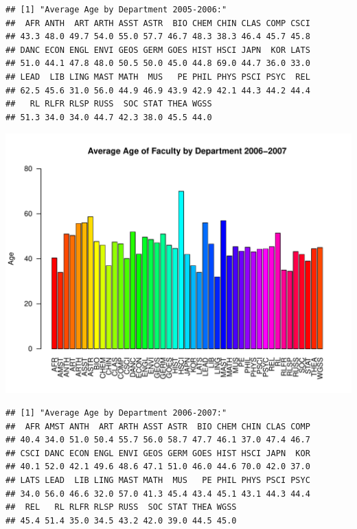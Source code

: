 \documentclass[12pt,a4paper]{article}\usepackage[]{graphicx}\usepackage[]{color}
\makeatletter
\def\maxwidth{ %
  \ifdim\Gin@nat@width>\linewidth
    \linewidth
  \else
    \Gin@nat@width
  \fi
}
\newenvironment{kframe}{%
 \def\at@end@of@kframe{}%
 \ifinner\ifhmode%
  \def\at@end@of@kframe{\end{minipage}}%
  \begin{minipage}{\columnwidth}%
 \fi\fi%
 \def\FrameCommand##1{\hskip\@totalleftmargin \hskip-\fboxsep
 \colorbox{shadecolor}{##1}\hskip-\fboxsep
     \hskip-\linewidth \hskip-\@totalleftmargin \hskip\columnwidth}%
 \MakeFramed {\advance\hsize-\width
   \@totalleftmargin\z@ \linewidth\hsize
   \@setminipage}}%
 {\par\unskip\endMakeFramed%
 \at@end@of@kframe}
\newenvironment{knitrout}{}{} %
\theoremstyle{definition}
\makeatother
\begin{document}
\begin{knitrout}
\begin{kframe}\begin{verbatim}
## [1] "Average Age by Department 2005-2006:"
##  AFR ANTH  ART ARTH ASST ASTR  BIO CHEM CHIN CLAS COMP CSCI 
## 43.3 48.0 49.7 54.0 55.0 57.7 46.7 48.3 38.3 46.4 45.7 45.8 
## DANC ECON ENGL ENVI GEOS GERM GOES HIST HSCI JAPN  KOR LATS 
## 51.0 44.1 47.8 48.0 50.5 50.0 45.0 44.8 69.0 44.7 36.0 33.0 
## LEAD  LIB LING MAST MATH  MUS   PE PHIL PHYS PSCI PSYC  REL 
## 62.5 45.6 31.0 56.0 44.9 46.9 43.9 42.9 42.1 44.3 44.2 44.4 
##   RL RLFR RLSP RUSS  SOC STAT THEA WGSS 
## 51.3 34.0 34.0 44.7 42.3 38.0 45.5 44.0
\end{verbatim}
\end{kframe}
\includegraphics[width=\maxwidth]{figure/unnamed-chunk-9-3} 
\begin{kframe}\begin{verbatim}
## [1] "Average Age by Department 2006-2007:"
##  AFR AMST ANTH  ART ARTH ASST ASTR  BIO CHEM CHIN CLAS COMP 
## 40.4 34.0 51.0 50.4 55.7 56.0 58.7 47.7 46.1 37.0 47.4 46.7 
## CSCI DANC ECON ENGL ENVI GEOS GERM GOES HIST HSCI JAPN  KOR 
## 40.1 52.0 42.1 49.6 48.6 47.1 51.0 46.0 44.6 70.0 42.0 37.0 
## LATS LEAD  LIB LING MAST MATH  MUS   PE PHIL PHYS PSCI PSYC 
## 34.0 56.0 46.6 32.0 57.0 41.3 45.4 43.4 45.1 43.1 44.3 44.4 
##  REL   RL RLFR RLSP RUSS  SOC STAT THEA WGSS 
## 45.4 51.4 35.0 34.5 43.2 42.0 39.0 44.5 45.0
\end{verbatim}
\end{kframe}

\end{knitrout}
\end{document}
